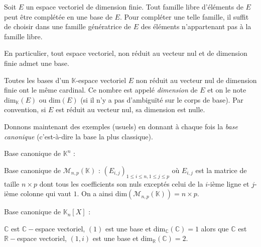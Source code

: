 \documentclass[a4paper,10pt]{report}
\begin{document}
 
 \begin{thm}\label{BaseInc}
 Soit $E$ un espace vectoriel de dimension finie. Tout famille libre d'éléments de $E$ peut être complétée en une base de $E$. Pour compléter une telle famille, il suffit de choisir dans une famille génératrice de $E$ des éléments n'appartenant pas à la famille libre.
 
 \medskip
 
\noindent En particulier, tout espace vectoriel, non réduit au vecteur nul et de dimension finie admet une base.
 \end{thm}
% 
% 
 \begin{thm} Toutes les bases d'un $\mathbb{K}$-espace vectoriel $E$ non réduit au vecteur nul de dimension finie ont le même cardinal. Ce nombre est appelé \textit{dimension} de $E$ et on le note $\textrm{dim}_{\mathbb{K}}(E)$ ou $\textrm{dim}(E)$ (si il n'y a pas d'ambiguïté sur le corps de base). Par convention, si $E$ est réduit au vecteur nul, sa dimension est nulle.
 \end{thm}
 
\newpage
 
 \noindent Donnons maintenant des exemples (usuels) en donnant à chaque fois la \textit{base canonique} (c'est-à-dire la base la plus classique).
 
 \medskip
 
 \begin{exems}
 \item Base canonique de $\mathbb{K}^n$ : 
 
 \item Base canonique de $\mathcal{M}_{n,p}(\mathbb{K})$ : $(E_{i,j})_{1 \leq i \leq n, 1 \leq j \leq p}$ où $E_{i,j}$ est la matrice de taille $n \times p$ dont tous les coefficients son nuls exceptés celui de la $i$-ième ligne et $j$-ième colonne qui vaut $1$. On a ainsi $\textrm{dim}(\mathcal{M}_{n,p}(\mathbb{K}))=n \times p$.
 \item Base canonique de $\mathbb{K}_n[X]$ : 
 
 \item $\mathbb{C}$ est $\mathbb{C}-$espace vectoriel, $(1)$ est une base et $\textrm{dim}_{\mathbb{C}}(\mathbb{C})=1$ alors que $\mathbb{C}$ est $\mathbb{R}-$espace vectoriel, $(1,i)$ est une base et $\textrm{dim}_{\mathbb{R}}(\mathbb{C})=2$.
 \end{exems}
 
\end{document}
